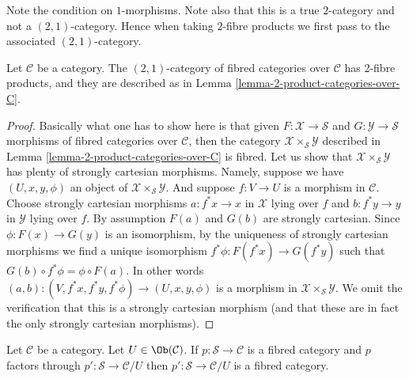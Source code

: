 \noindent
Note the condition on $1$-morphisms.
Note also that this is a true $2$-category and
not a $(2, 1)$-category. Hence when taking $2$-fibre
products we first pass to the associated $(2, 1)$-category.

\begin{lemma}
\label{lemma-2-product-fibred-categories-over-C}
Let $\mathcal{C}$ be a category.
The $(2, 1)$-category of fibred categories
over $\mathcal{C}$ has 2-fibre products, and
they are described as in
Lemma \ref{lemma-2-product-categories-over-C}.
\end{lemma}

\begin{proof}
Basically what one has to show here is that given
$F : \mathcal{X} \to \mathcal{S}$ and
$G : \mathcal{Y} \to \mathcal{S}$ morphisms of fibred
categories over $\mathcal{C}$, then the category
$\mathcal{X} \times_\mathcal{S} \mathcal{Y}$
described in Lemma \ref{lemma-2-product-categories-over-C} is fibred.
Let us show that $\mathcal{X} \times_\mathcal{S} \mathcal{Y}$
has plenty of strongly cartesian morphisms.
Namely, suppose we have $(U, x, y, \phi)$ an object of
$\mathcal{X} \times_\mathcal{S} \mathcal{Y}$.
And suppose $f : V \to U$ is a morphism in $\mathcal{C}$.
Choose strongly cartesian morphisms $a : f^*x \to x$ in $\mathcal{X}$
lying over $f$ and $b : f^*y \to y$ in $\mathcal{Y}$ lying over $f$.
By assumption $F(a)$ and $G(b)$ are strongly cartesian.
Since $\phi : F(x) \to G(y)$ is an isomorphism, by the uniqueness
of strongly cartesian morphisms we find a unique isomorphism
$f^*\phi : F(f^*x) \to G(f^*y)$ such that
$G(b) \circ f^*\phi = \phi \circ F(a)$. In other words
$(a, b) : (V, f^*x, f^*y, f^*\phi) \to (U, x, y, \phi)$
is a morphism in $\mathcal{X} \times_\mathcal{S} \mathcal{Y}$.
We omit the verification that this is a strongly cartesian morphism
(and that these are in fact the only strongly cartesian morphisms).
\end{proof}

\begin{lemma}
\label{lemma-cute}
Let $\mathcal{C}$ be a category. Let $U \in \Ob(\mathcal{C})$.
If $p : \mathcal{S} \to \mathcal{C}$ is a fibred category
and $p$ factors through $p' : \mathcal{S} \to \mathcal{C}/U$
then $p' : \mathcal{S} \to \mathcal{C}/U$ is a fibred category.
\end{lemma}


